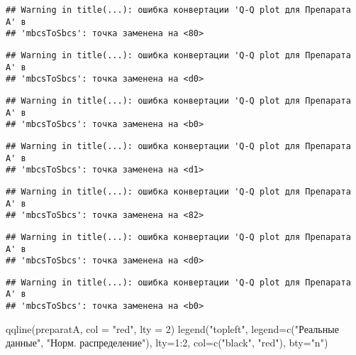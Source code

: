 \documentclass[
]{article}
\newenvironment{Shaded}{\begin{snugshade}}{\end{snugshade}}
\newcommand{\AttributeTok}[1]{\textcolor[rgb]{0.77,0.63,0.00}{#1}}
\newcommand{\DecValTok}[1]{\textcolor[rgb]{0.00,0.00,0.81}{#1}}
\newcommand{\FunctionTok}[1]{\textcolor[rgb]{0.00,0.00,0.00}{#1}}
\newcommand{\NormalTok}[1]{#1}
\newcommand{\SpecialCharTok}[1]{\textcolor[rgb]{0.00,0.00,0.00}{#1}}
\newcommand{\StringTok}[1]{\textcolor[rgb]{0.31,0.60,0.02}{#1}}
\begin{document}
\begin{verbatim}
## Warning in title(...): ошибка конвертации 'Q-Q plot для Препарата A' в
## 'mbcsToSbcs': точка заменена на <80>
\end{verbatim}

\begin{verbatim}
## Warning in title(...): ошибка конвертации 'Q-Q plot для Препарата A' в
## 'mbcsToSbcs': точка заменена на <d0>
\end{verbatim}

\begin{verbatim}
## Warning in title(...): ошибка конвертации 'Q-Q plot для Препарата A' в
## 'mbcsToSbcs': точка заменена на <b0>
\end{verbatim}

\begin{verbatim}
## Warning in title(...): ошибка конвертации 'Q-Q plot для Препарата A' в
## 'mbcsToSbcs': точка заменена на <d1>
\end{verbatim}

\begin{verbatim}
## Warning in title(...): ошибка конвертации 'Q-Q plot для Препарата A' в
## 'mbcsToSbcs': точка заменена на <82>
\end{verbatim}

\begin{verbatim}
## Warning in title(...): ошибка конвертации 'Q-Q plot для Препарата A' в
## 'mbcsToSbcs': точка заменена на <d0>
\end{verbatim}

\begin{verbatim}
## Warning in title(...): ошибка конвертации 'Q-Q plot для Препарата A' в
## 'mbcsToSbcs': точка заменена на <b0>
\end{verbatim}

\begin{Shaded}
\begin{Highlighting}[]
\FunctionTok{qqline}\NormalTok{(preparatA, }\AttributeTok{col =} \StringTok{"red"}\NormalTok{, }\AttributeTok{lty =} \DecValTok{2}\NormalTok{)}
\FunctionTok{legend}\NormalTok{(}\StringTok{"topleft"}\NormalTok{, }\AttributeTok{legend=}\FunctionTok{c}\NormalTok{(}\StringTok{"Реальные данные"}\NormalTok{, }\StringTok{"Норм. распределение"}\NormalTok{), }\AttributeTok{lty=}\DecValTok{1}\SpecialCharTok{:}\DecValTok{2}\NormalTok{, }\AttributeTok{col=}\FunctionTok{c}\NormalTok{(}\StringTok{"black"}\NormalTok{, }\StringTok{"red"}\NormalTok{), }\AttributeTok{bty=}\StringTok{"n"}\NormalTok{)}
\end{Highlighting}
\end{Shaded}
\end{document}
